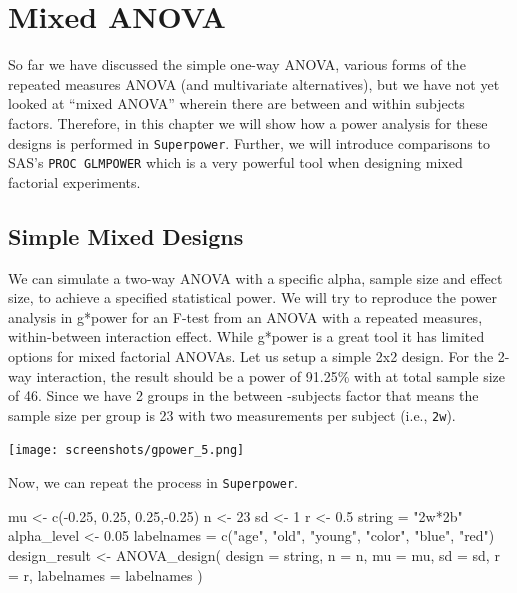 \documentclass[
]{book}
\newenvironment{Shaded}{\begin{snugshade}}{\end{snugshade}}
\newcommand{\AttributeTok}[1]{\textcolor[rgb]{0.77,0.63,0.00}{#1}}
\newcommand{\DecValTok}[1]{\textcolor[rgb]{0.00,0.00,0.81}{#1}}
\newcommand{\FloatTok}[1]{\textcolor[rgb]{0.00,0.00,0.81}{#1}}
\newcommand{\FunctionTok}[1]{\textcolor[rgb]{0.00,0.00,0.00}{#1}}
\newcommand{\NormalTok}[1]{#1}
\newcommand{\OtherTok}[1]{\textcolor[rgb]{0.56,0.35,0.01}{#1}}
\newcommand{\SpecialCharTok}[1]{\textcolor[rgb]{0.00,0.00,0.00}{#1}}
\newcommand{\StringTok}[1]{\textcolor[rgb]{0.31,0.60,0.02}{#1}}
\begin{document}
\hypertarget{mixed-anova}{%
\chapter{Mixed ANOVA}\label{mixed-anova}}

So far we have discussed the simple one-way ANOVA, various forms of the repeated measures ANOVA (and multivariate alternatives), but we have not yet looked at ``mixed ANOVA'' wherein there are between and within subjects factors. Therefore, in this chapter we will show how a power analysis for these designs is performed in \texttt{Superpower}. Further, we will introduce comparisons to SAS's \texttt{PROC\ GLMPOWER} which is a very powerful tool when designing mixed factorial experiments.

\hypertarget{simple-mixed-designs}{%
\section{Simple Mixed Designs}\label{simple-mixed-designs}}

We can simulate a two-way ANOVA with a specific alpha, sample size and effect size, to achieve a specified statistical power. We will try to reproduce the power analysis in g*power \citep{faul2007g} for an F-test from an ANOVA with a repeated measures, within-between interaction effect. While g*power is a great tool it has limited options for mixed factorial ANOVAs.
\newpage 
Let us setup a simple 2x2 design.
For the 2-way interaction, the result should be a power of 91.25\% with at total sample size of 46. Since we have 2 groups in the between -subjects factor that means the sample size per group is 23 with two measurements per subject (i.e., \texttt{2w}).

\texttt{[image: screenshots/gpower\_5.png]}
\newpage

Now, we can repeat the process in \texttt{Superpower}.

\begin{Shaded}
\begin{Highlighting}[]
\NormalTok{mu }\OtherTok{\textless{}{-}} \FunctionTok{c}\NormalTok{(}\SpecialCharTok{{-}}\FloatTok{0.25}\NormalTok{, }\FloatTok{0.25}\NormalTok{, }\FloatTok{0.25}\NormalTok{,}\SpecialCharTok{{-}}\FloatTok{0.25}\NormalTok{)}
\NormalTok{n }\OtherTok{\textless{}{-}} \DecValTok{23}
\NormalTok{sd }\OtherTok{\textless{}{-}} \DecValTok{1}
\NormalTok{r }\OtherTok{\textless{}{-}} \FloatTok{0.5}
\NormalTok{string }\OtherTok{=} \StringTok{"2w*2b"}
\NormalTok{alpha\_level }\OtherTok{\textless{}{-}} \FloatTok{0.05}
\NormalTok{labelnames }\OtherTok{=} \FunctionTok{c}\NormalTok{(}\StringTok{"age"}\NormalTok{, }\StringTok{"old"}\NormalTok{, }\StringTok{"young"}\NormalTok{, }\StringTok{"color"}\NormalTok{, }\StringTok{"blue"}\NormalTok{, }\StringTok{"red"}\NormalTok{)}
\NormalTok{design\_result }\OtherTok{\textless{}{-}} \FunctionTok{ANOVA\_design}\NormalTok{(}
\AttributeTok{design =}\NormalTok{ string,}
\AttributeTok{n =}\NormalTok{ n,}
\AttributeTok{mu =}\NormalTok{ mu,}
\AttributeTok{sd =}\NormalTok{ sd,}
\AttributeTok{r =}\NormalTok{ r,}
\AttributeTok{labelnames =}\NormalTok{ labelnames}
\NormalTok{)}
\end{Highlighting}
\end{Shaded}
\end{document}
